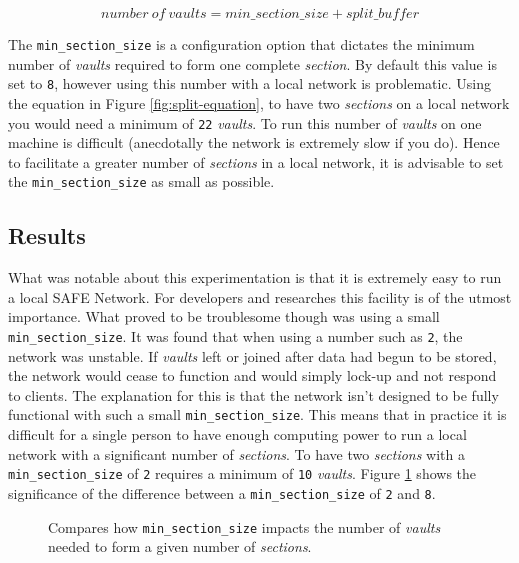 \begin{equation}
	number\ of\ vaults = min\_section\_size + split\_buffer
	\label{fig:split-equation}
\end{equation}

The \texttt{min\_section\_size} is a configuration option that dictates the minimum number of \textit{vaults} required to form one complete \textit{section}. By default this value is set to \texttt{8}, however using this number with a local network is problematic. Using the equation in Figure \ref{fig:split-equation}, to have two \textit{sections} on a local network you would need a minimum of \texttt{22} \textit{vaults}. To run this number of \textit{vaults} on one machine is difficult (anecdotally the network is extremely slow if you do). Hence to facilitate a greater number of \textit{sections} in a local network, it is advisable to set the \texttt{min\_section\_size} as small as possible.

\subsection{Results}

What was notable about this experimentation is that it is extremely easy to run a local SAFE Network. For developers and researches this facility is of the utmost importance. What proved to be troublesome though was using a small \texttt{min\_section\_size}. It was found that when using a number such as \texttt{2}, the network was unstable. If \textit{vaults} left or joined after data had begun to be stored, the network would cease to function and would simply lock-up and not respond to clients. The explanation for this is that the network isn't designed to be fully functional with such a small \texttt{min\_section\_size}. This means that in practice it is difficult for a single person to have enough computing power to run a local network with a significant number of \textit{sections}. To have two \textit{sections} with a \texttt{min\_section\_size} of \texttt{2} requires a minimum of \texttt{10} \textit{vaults}. Figure \ref{fig:min-section-size-graph} shows the significance of the difference between a \texttt{min\_section\_size} of \texttt{2} and \texttt{8}.

\begin{figure}
\centering
{}

\caption{Compares how \texttt{min\_section\_size} impacts the number of \textit{vaults} needed to form a given number of \textit{sections}.}
\label{fig:min-section-size-graph}
\end{figure}

